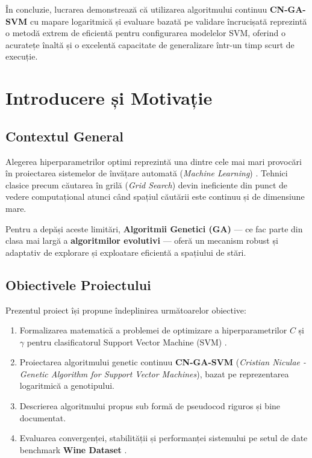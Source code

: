 \documentclass[12pt,a4paper]{report}
\begin{document}
În concluzie, lucrarea demonstrează că utilizarea algoritmului continuu \textbf{CN-GA-SVM} cu mapare logaritmică și evaluare bazată pe validare încrucișată reprezintă o metodă extrem de eficientă pentru configurarea modelelor SVM, oferind o acuratețe înaltă și o excelentă capacitate de generalizare într-un timp scurt de execuție.


\chapter{Introducere și Motivație}

\section{Contextul General}
Alegerea hiperparametrilor optimi reprezintă una dintre cele mai mari provocări în proiectarea sistemelor de învățare automată (\textit{Machine Learning}) \cite{bergstra2012random}. Tehnici clasice precum căutarea în grilă (\textit{Grid Search}) devin ineficiente din punct de vedere computațional atunci când spațiul căutării este continuu și de dimensiune mare.

Pentru a depăși aceste limitări, \textbf{Algoritmii Genetici (GA)} — ce fac parte din clasa mai largă a \textbf{algoritmilor evolutivi} \cite{goldberg1989genetic} — oferă un mecanism robust și adaptativ de explorare și exploatare eficientă a spațiului de stări.

\section{Obiectivele Proiectului}
Prezentul proiect își propune îndeplinirea următoarelor obiective:
\begin{enumerate}
    \item Formalizarea matematică a problemei de optimizare a hiperparametrilor $C$ și $\gamma$ pentru clasificatorul Support Vector Machine (SVM) \cite{vapnik1995nature}.
    \item Proiectarea algoritmului genetic continuu \textbf{CN-GA-SVM} (\textit{Cristian Niculae - Genetic Algorithm for Support Vector Machines}), bazat pe reprezentarea logaritmică a genotipului.
    \item Descrierea algoritmului propus sub formă de pseudocod riguros și bine documentat.
    \item Evaluarea convergenței, stabilității și performanței sistemului pe setul de date benchmark \textbf{Wine Dataset} \cite{f详细wine1991}.
\end{enumerate}
\end{document}
